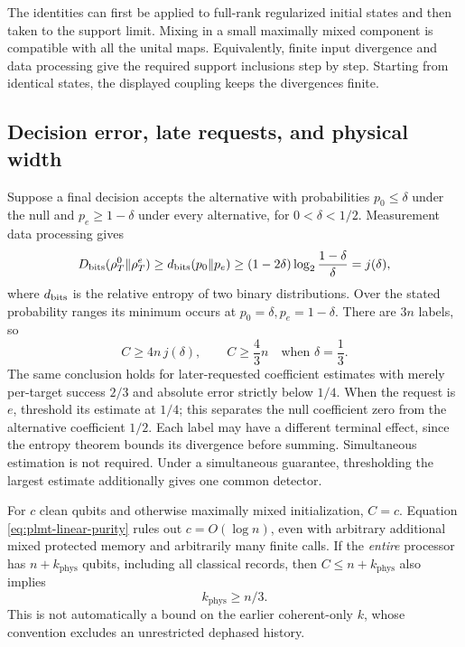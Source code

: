 \documentclass[11pt,a4paper]{article}
\numberwithin{equation}{section}
\theoremstyle{definition}
\theoremstyle{remark}
\begin{document}
The identities can first be applied to full-rank regularized initial states and then taken to the support limit. Mixing in a small maximally mixed component is compatible with all the unital maps. Equivalently, finite input divergence and data processing give the required support inclusions step by step. Starting from identical states, the displayed coupling keeps the divergences finite.

\subsection{Decision error, late requests, and physical width}
Suppose a final decision accepts the alternative with probabilities
\(p_0\leq\delta\) under the null and \(p_e\geq1-\delta\) under every alternative, for \(0<\delta<1/2\). Measurement data processing gives
\[
 D_{\rm bits}(\rho_T^0\Vert\rho_T^e)
 \geq d_{\rm bits}(p_0\Vert p_e)
 \geq(1-2\delta)\log_2\frac{1-\delta}{\delta}
 =j(\delta),
\]
where \(d_{\rm bits}\) is the relative entropy of two binary distributions. Over the stated probability ranges its minimum occurs at \(p_0=\delta,p_e=1-\delta\). There are \(3n\) labels, so
\begin{equation}
 C\geq4n\,j(\delta),\qquad
 \boxed{C\geq\frac43n\quad\text{when }\delta=\frac13.}
 \label{eq:plmt-linear-purity}
\end{equation}
The same conclusion holds for later-requested coefficient estimates with merely per-target success \(2/3\) and absolute error strictly below \(1/4\). When the request is \(e\), threshold its estimate at \(1/4\); this separates the null coefficient zero from the alternative coefficient \(1/2\). Each label may have a different terminal effect, since the entropy theorem bounds its divergence before summing. Simultaneous estimation is not required. Under a simultaneous guarantee, thresholding the largest estimate additionally gives one common detector.

For \(c\) clean qubits and otherwise maximally mixed initialization, \(C=c\). Equation \eqref{eq:plmt-linear-purity} rules out \(c=O(\log n)\), even with arbitrary additional mixed protected memory and arbitrarily many finite calls. If the \emph{entire} processor has \(n+k_{\mathrm{phys}}\) qubits, including all classical records, then \(C\leq n+k_{\mathrm{phys}}\) also implies
\begin{equation}
 k_{\mathrm{phys}}\geq n/3.
\end{equation}
This is not automatically a bound on the earlier coherent-only \(k\), whose convention excludes an unrestricted dephased history.
\end{document}
